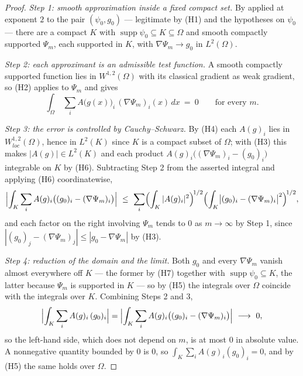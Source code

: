 \begin{proof}
\emph{Step 1: smooth approximation inside a fixed compact set.}  By
 applied at exponent $2$ to the pair
$(\psi_0,g_0)$ --- legitimate by (H1) and the hypotheses on $\psi_0$ --- there
are a compact $K$ with $\operatorname{supp}\psi_0\subseteq K\subseteq\Omega$ and
smooth compactly supported $\Psi_m$, each supported in $K$, with
$\nabla\Psi_m\to g_0$ in $L^2(\Omega)$.

\emph{Step 2: each approximant is an admissible test function.}  A smooth
compactly supported function lies in $W^{1,2}(\Omega)$ with its classical
gradient as weak gradient, so (H2) applies to $\Psi_m$ and gives
\[
\int_\Omega\ \sum_i A\bigl(g(x)\bigr)_i\,(\nabla\Psi_m)_i(x)\,dx\ =\ 0
\qquad\text{for every }m .
\]

\emph{Step 3: the error is controlled by Cauchy--Schwarz.}  By (H4) each
$A(g)_i$ lies in $W^{1,2}_{loc}(\Omega)$, hence in $L^2(K)$ since $K$ is a
compact subset of $\Omega$; with (H3) this makes $|A(g)|\in L^2(K)$ and each
product $A(g)_i\bigl((\nabla\Psi_m)_i-(g_0)_i\bigr)$ integrable on $K$ by
(H6).  Subtracting Step 2 from the asserted integral and applying (H6)
coordinatewise,
\[
\Bigl|\int_K\sum_iA(g)_i\bigl((g_0)_i-(\nabla\Psi_m)_i\bigr)\Bigr|
\ \le\ \sum_i\Bigl(\int_K|A(g)_i|^2\Bigr)^{\!1/2}
  \Bigl(\int_K\bigl|(g_0)_i-(\nabla\Psi_m)_i\bigr|^2\Bigr)^{\!1/2},
\]
and each factor on the right involving $\Psi_m$ tends to $0$ as $m\to\infty$ by
Step 1, since $|(g_0)_j-(\nabla\Psi_m)_j|\le|g_0-\nabla\Psi_m|$ by (H3).

\emph{Step 4: reduction of the domain and the limit.}  Both $g_0$ and every
$\nabla\Psi_m$ vanish almost everywhere off $K$ --- the former by (H7) together
with $\operatorname{supp}\psi_0\subseteq K$, the latter because $\Psi_m$ is
supported in $K$ --- so by (H5) the integrals over $\Omega$ coincide with the
integrals over $K$.  Combining Steps 2 and 3,
\[
\Bigl|\int_K\sum_iA(g)_i\,(g_0)_i\Bigr|
=\Bigl|\int_K\sum_iA(g)_i\bigl((g_0)_i-(\nabla\Psi_m)_i\bigr)\Bigr|
\ \longrightarrow\ 0 ,
\]
so the left-hand side, which does not depend on $m$, is at most $0$ in
absolute value.  A nonnegative quantity bounded by $0$ is $0$, so
$\int_K\sum_iA(g)_i(g_0)_i=0$, and by (H5) the same holds over $\Omega$.
\end{proof}
